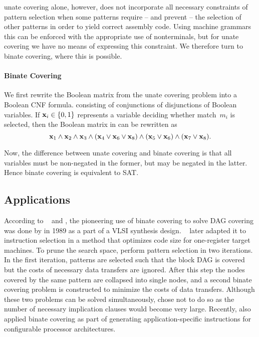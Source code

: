 \Gls{unate covering} alone, however, does not incorporate all necessary
\glspl{constraint} of \gls{pattern selection} when some \glspl{pattern} require
-- and prevent -- the selection of other \glspl{pattern} in order to yield
correct \gls{assembly code}.
%
Using \glspl{machine grammar} this can be enforced with the appropriate use of
\glspl{nonterminal}, but for \gls{unate covering} we have no means of expressing
this \gls{constraint}.
%
We therefore turn to \gls{binate covering}, where this is possible.


\paragraph{Binate Covering}

We first rewrite the Boolean matrix from the \gls{unate covering} problem into a
Boolean \gls{CNF} formula.  consisting of conjunctions of disjunctions of
Boolean \glspl{variable}.
%
If \mbox{$\mVar{x}_i \in \mSet{0, 1}$} represents a \gls{variable} deciding
whether \gls{match}~$m_i$ is selected, then the Boolean matrix in
 can be rewritten as
%
\begin{displaymath}
  \mVar{x}_1 \mAnd \mVar{x}_2 \mAnd \mVar{x}_3 \mAnd (\mVar{x}_4 \mOr \mVar{x}_6
  \mOr \mVar{x}_8) \mAnd (\mVar{x}_5 \mOr \mVar{x}_6) \mAnd (\mVar{x}_7 \mOr
  \mVar{x}_8).
\end{displaymath}

Now, the difference between \gls{unate covering} and \gls{binate covering} is
that all \glspl{variable} must be non-negated in the former, but may be negated
in the latter.
%
Hence \gls{binate covering} is equivalent to \gls{SAT}.


\subsection{Applications}

According to \citeauthor{LiaoEtAl:1995}~\cite{LiaoEtAl:1995, LiaoEtAl:1998} and
\textcite{CongEtAl:2004}, the pioneering use of \gls{binate covering} to solve
\gls{DAG covering} was done by \textcite{Rudell:1989} in 1989 as a part of a
\gls{VLSI} synthesis design.
%
\citeauthor{LiaoEtAl:1995}~\cite{LiaoEtAl:1995, LiaoEtAl:1998} later adapted it
to \gls{instruction selection} in a method that optimizes code size for
one-\gls{register} \glspl{target machine}.
%
To prune the search space, \citeauthor{LiaoEtAl:1995} perform \gls{pattern
  selection} in two iterations.
%
In the first iteration, \glspl{pattern} are selected such that the \gls{block
  DAG} is covered but the costs of necessary data transfers are ignored.
%
After this step the \glspl{node} covered by the same \gls{pattern} are collapsed
into single \glspl{node}, and a second \gls{binate covering} problem is
constructed to minimize the costs of data transfers.
%
Although these two problems can be solved simultaneously,
\citeauthor{LiaoEtAl:1995} chose not to do so as the number of necessary
\glspl{implication clause} would become very large.
%
Recently, \textcite{CongEtAl:2004} also applied \gls{binate covering} as part of
generating application-specific \glspl{instruction} for configurable processor
architectures.

